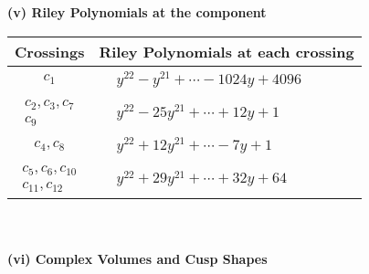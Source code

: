 \documentclass[1p]{elsarticle_modified}
\theoremstyle{definition}
\begin{document}
\newpage\renewcommand{\arraystretch}{1}
\flushleft \textbf{(v) Riley Polynomials at the component}\newline \\
\begin{tabular}{m{50pt}|m{274pt}}
Crossings & \hspace{64pt}Riley Polynomials at each crossing \\
\hline $$\begin{aligned}c_{1}\end{aligned}$$&$\begin{aligned}
&y^{22}- y^{21}+\cdots-1024 y+4096
\end{aligned}$\\
\hline $$\begin{aligned}c_{2},c_{3},c_{7}\\c_{9}\end{aligned}$$&$\begin{aligned}
&y^{22}-25 y^{21}+\cdots+12 y+1
\end{aligned}$\\
\hline $$\begin{aligned}c_{4},c_{8}\end{aligned}$$&$\begin{aligned}
&y^{22}+12 y^{21}+\cdots-7 y+1
\end{aligned}$\\
\hline $$\begin{aligned}c_{5},c_{6},c_{10}\\c_{11},c_{12}\end{aligned}$$&$\begin{aligned}
&y^{22}+29 y^{21}+\cdots+32 y+64
\end{aligned}$\\
\hline
\end{tabular}\\~\\
\newpage\flushleft \textbf{(vi) Complex Volumes and Cusp Shapes}
\end{document}

